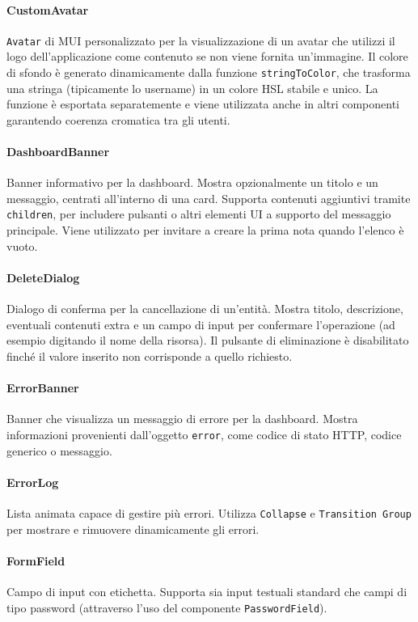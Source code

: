 \documentclass[11pt]{article}
\begin{document}
\paragraph{CustomAvatar} 
\texttt{Avatar} di MUI personalizzato per la visualizzazione di un avatar che utilizzi il logo dell’applicazione come contenuto se non viene fornita un’immagine.
Il colore di sfondo è generato dinamicamente dalla funzione \texttt{stringToColor}, che trasforma una stringa (tipicamente lo username) in un colore HSL stabile e unico.  
La funzione è esportata separatemente e viene utilizzata anche in altri componenti garantendo coerenza cromatica tra gli utenti.

\paragraph{DashboardBanner} 
Banner informativo per la dashboard. 
Mostra opzionalmente un titolo e un messaggio, centrati all’interno di una card. 
Supporta contenuti aggiuntivi tramite \texttt{children}, per includere pulsanti o altri elementi UI a supporto del messaggio principale. Viene utilizzato per invitare a creare la prima nota quando l’elenco è vuoto.

\paragraph{DeleteDialog}  
Dialogo di conferma per la cancellazione di un’entità.  
Mostra titolo, descrizione, eventuali contenuti extra e un campo di input per confermare l’operazione (ad esempio digitando il nome della risorsa).  
Il pulsante di eliminazione è disabilitato finché il valore inserito non corrisponde a quello richiesto.  

\paragraph{ErrorBanner}  
Banner che visualizza un messaggio di errore per la dashboard.  
Mostra informazioni provenienti dall’oggetto \texttt{error}, come codice di stato HTTP, codice generico o messaggio.

\paragraph{ErrorLog}  
Lista animata capace di gestire più errori.  
Utilizza \texttt{Collapse} e \texttt{Transition Group} per mostrare e rimuovere dinamicamente gli errori. 

\paragraph{FormField}  
Campo di input con etichetta.  
Supporta sia input testuali standard che campi di tipo password (attraverso l’uso del componente \texttt{PasswordField}).
\end{document}
